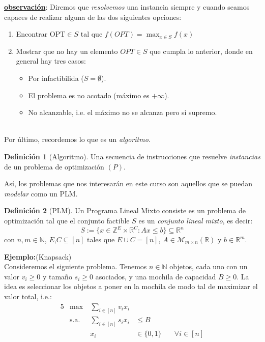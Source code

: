 \documentclass[10pt]{article}
\newcommand{\R}{\mathbb R}
\newcommand{\N}{\mathbb N}
\newcommand{\Z}{\mathbb Z}
\theoremstyle{plain}
\theoremstyle{definition}
\newtheorem{defi}{Definición}
\begin{document}
\underline{\textbf{observación}}: Diremos que \textit{resolvemos} una instancia siempre y cuando seamos capaces de realizar alguna de las dos siguientes opciones:\\

\begin{enumerate}
\item Encontrar $\text{OPT} \in S$ tal que $f(OPT) = \max_{x \in S} f(x)$

\item Mostrar que no hay un elemento $OPT \in S$ que cumpla lo anterior, donde en general hay tres casos:
\begin{itemize}
\item Por infactibilida ($S  = \emptyset$).
\item El problema es no acotado (máximo es $+ \infty$).
\item No alcanzable, i.e. el máximo no se alcanza pero si supremo.
\end{itemize}
\end{enumerate}
~\\
Por último, recordemos lo que es un \textit{algoritmo}.\\
\begin{defi}[Algoritmo]
Una secuencia de instrucciones que resuelve \textit{instancias} de un problema de optimización $(P)$.
\end{defi}

Así, los problemas que nos interesarán en este curso son aquellos que se puedan \textit{modelar} como un PLM.\\

\begin{defi}[PLM]
Un Programa Lineal Mixto consiste es un problema de optimización tal que el conjunto factible $S$ es un \textit{conjunto lineal mixto}, es decir:
$$
S := \{x \in \Z^E \times \R^C: Ax \leq b \} \subseteq \R^n
$$
con $n, m \in \N$, $E$,$C \subseteq [n]$ tales que $E \cup C = [n]$, $A \in \mathcal{M}_{m \times n}(\R)$ y $b \in \R^m$.\\
\end{defi}

\textbf{Ejemplo:}(Knapsack)\\ 

Consideremos el siguiente problema. Tenemos $n \in \N$ objetos, cada uno con un valor $v_i \geq 0$ y tamaño $s_i \geq 0$ asociados, y una mochila de capacidad $B \geq 0$. La  idea es seleccionar los objetos a poner en la mochila de modo tal de maximizar el valor total, i.e.:
\begin{alignat*}{5}
&\max\        & \sum_{i \in [n]} v_i x_i \\
&\text{s.a. } & \sum_{i \in [n]} s_i x_i&\leq B &  \\
&                  & x_i                       &\in \{0,1\} &\quad\forall i \in [n] 
\end{alignat*}
\end{document}
